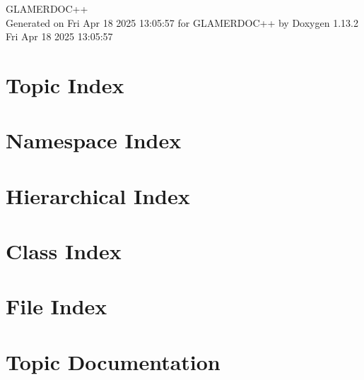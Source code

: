 \documentclass[twoside]{book}
\newcommand{\+}{\discretionary{\mbox{\scriptsize$\hookleftarrow$}}{}{}}
\newcommand{\clearemptydoublepage}{%
    \newpage{\pagestyle{empty}\cleardoublepage}%
  }
\begin{document}
  \raggedbottom
    \hypersetup{pageanchor=false,
                bookmarksnumbered=true,
                pdfencoding=unicode
               }
  \begin{titlepage}
  \vspace*{7cm}
  \begin{center}%
  {\Large GLAMERDOC++}\\
  \vspace*{1cm}
  {\large Generated on Fri Apr 18 2025 13\+:05\+:57 for GLAMERDOC++ by Doxygen 1.13.2}\\
    \vspace*{0.5cm}
    {\small Fri Apr 18 2025 13:05:57}
  \end{center}
  \end{titlepage}
  \clearemptydoublepage
  \tableofcontents
  \clearemptydoublepage
  \hypersetup{pageanchor=true}



\chapter{Topic Index}

\chapter{Namespace Index}

\chapter{Hierarchical Index}

\chapter{Class Index}

\chapter{File Index}

\chapter{Topic Documentation}















\end{document}

